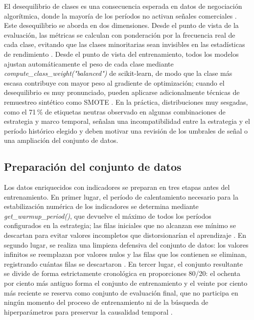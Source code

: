 El desequilibrio de clases es una consecuencia esperada en datos de
negociación algorítmica, donde la mayoría de los períodos no activan señales
comerciales \parencite{lopez_de_prado_advances_2018}. Este desequilibrio se
aborda en dos dimensiones. Desde el punto de vista de la evaluación, las
métricas se calculan con ponderación por la frecuencia real de cada clase,
evitando que las clases minoritarias sean invisibles en las estadísticas de
rendimiento \parencite{pedregosa_scikit_2011}. Desde el punto de vista del
entrenamiento, todos los modelos ajustan automáticamente el peso de cada clase
mediante \textit{compute\_class\_weight("balanced")} de scikit-learn, de modo
que la clase más escasa contribuye con mayor peso al gradiente de optimización;
cuando el desequilibrio es muy pronunciado, pueden aplicarse adicionalmente
técnicas de remuestreo sintético como SMOTE \parencite{chawla_smote_2002}. En
la práctica, distribuciones muy sesgadas, como el 71\,\% de etiquetas neutras
observado en algunas combinaciones de estrategia y marco temporal, señalan una
incompatibilidad entre la estrategia y el período histórico elegido y deben
motivar una revisión de los umbrales de señal o una ampliación del conjunto de
datos.

\subsection{Preparación del conjunto de datos}

Los datos enriquecidos con indicadores se preparan en tres etapas antes del
entrenamiento. En primer lugar, el período de calentamiento necesario para la
estabilización numérica de los indicadores se determina mediante
\textit{get\_warmup\_period()}, que devuelve el máximo de todos los períodos
configurados en la estrategia; las filas iniciales que no alcanzan ese mínimo
se descartan para evitar valores incompletos que distorsionarían el aprendizaje
\parencite{murphy_technical_1999}. En segundo lugar, se realiza una limpieza
defensiva del conjunto de datos: los valores infinitos se reemplazan por
valores nulos y las filas que los contienen se eliminan, registrando cuántas
filas se descartaron \parencite{mckinney_python_2022}. En tercer lugar, el
conjunto resultante se divide de forma estrictamente cronológica en proporciones
80/20: el ochenta por ciento más antiguo forma el conjunto de entrenamiento y
el veinte por ciento más reciente se reserva como conjunto de evaluación final,
que no participa en ningún momento del proceso de entrenamiento ni de la
búsqueda de hiperparámetros para preservar la causalidad temporal
\parencite{goodfellow_deep_2016,lopez_de_prado_advances_2018}.

